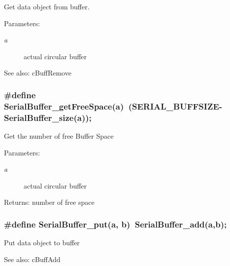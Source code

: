 Get data object from buffer. \begin{Desc}
\item[Parameters:]
\begin{description}
\item[{\em a}]actual circular buffer \end{description}
\end{Desc}
\begin{Desc}
\item[See also:]cBuffRemove \end{Desc}
\hypertarget{group___serial_ge32a6db48ef3832f49f6551fcdfa19d9}{
\subsubsection[{SerialBuffer\_\-getFreeSpace}]{\setlength{\rightskip}{0pt plus 5cm}\#define SerialBuffer\_\-getFreeSpace(a)~(SERIAL\_\-BUFFSIZE-SerialBuffer\_\-size(a));}}
\label{group___serial_ge32a6db48ef3832f49f6551fcdfa19d9}


Get the number of free Buffer Space \begin{Desc}
\item[Parameters:]
\begin{description}
\item[{\em a}]actual circular buffer \end{description}
\end{Desc}
\begin{Desc}
\item[Returns:]number of free space \end{Desc}
\hypertarget{group___serial_g8c36b7f3380a02dc72bd23604acb63c5}{
\subsubsection[{SerialBuffer\_\-put}]{\setlength{\rightskip}{0pt plus 5cm}\#define SerialBuffer\_\-put(a, \/  b)~SerialBuffer\_\-add(a,b);}}
\label{group___serial_g8c36b7f3380a02dc72bd23604acb63c5}


Put data object to buffer \begin{Desc}
\item[See also:]cBuffAdd \end{Desc}


